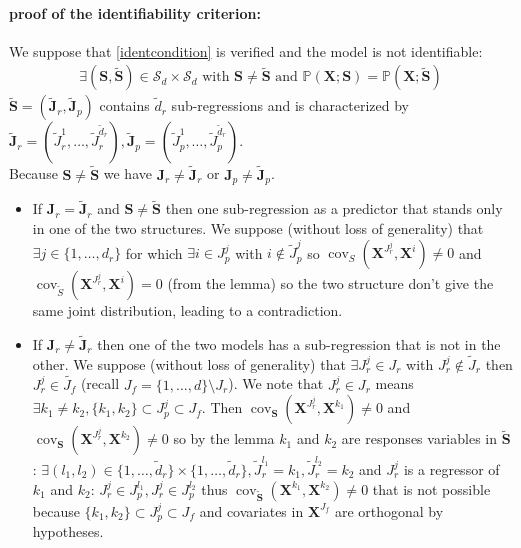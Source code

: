 \documentclass[11pt,a4paper]{article}
\begin{document}
\paragraph{proof of the identifiability criterion:} We suppose that \ref{identcondition} is verified and the model is not identifiable:
\begin{eqnarray}
	\exists (\boldsymbol{S},\tilde{\boldsymbol{S}}) \in \mathcal{S}_d\times \mathcal{S}_d \textrm{ with } \boldsymbol{S} \neq \tilde{\boldsymbol{S}} \textrm{ and }
	\mathbb{P}(\boldsymbol{X};\boldsymbol{S})=\mathbb{P}(\boldsymbol{X};\tilde{\boldsymbol{S}})
 \end{eqnarray}
 $\tilde{\boldsymbol{S}}=(\tilde{\boldsymbol{J}}_r,\tilde{\boldsymbol{J}}_p)$ contains $\tilde{d}_r$ sub-regressions and is characterized by $\tilde{\boldsymbol{J}}_r=(\tilde{J}_r^1,\dots,\tilde{J}_r^{\tilde{d}_r}),\tilde{\boldsymbol{J}}_p=(\tilde{J}_p^1,\dots,\tilde{J}_p^{\tilde{d}_r})$.\\
Because $\boldsymbol{S}\neq \tilde{\boldsymbol{S}} $ we have $\boldsymbol{J}_r\neq \tilde{\boldsymbol{J}}_r$ or $\boldsymbol{J}_p\neq \tilde{\boldsymbol{J}}_p$.
\begin{itemize}
\item If $\boldsymbol{J}_r = \tilde{\boldsymbol{J}}_r$ and $\boldsymbol{S}\neq \tilde{\boldsymbol{S}}$ then one sub-regression as a predictor that stands only in one of the two structures. We suppose (without loss of generality) that $\exists j \in \{1,\dots,d_r\}$ for which
$\exists i \in J_p^j$ with $i \notin \tilde{J}_p^j$ so $\operatorname{cov}_{S}(\boldsymbol{X}^{J_r^j},\boldsymbol{X}^{i})\neq 0$ and $\operatorname{cov}_{\tilde{S}}(\boldsymbol{X}^{J_r^j},\boldsymbol{X}^{i})= 0$ (from the lemma) so the two structure don't give the same joint distribution, leading to a contradiction.
\item If $\boldsymbol{J}_r\neq \tilde{\boldsymbol{J}}_r$ then one of the two models has a sub-regression that is not in the other. We suppose (without loss of generality) that
 $\exists J_r^j \in J_r$ with $J_r^j \notin \tilde{J}_r$ then $J_r^j\in \tilde{J_f}$ (recall $J_f=\{1,\dots,d \}\setminus J_r$). We note that $J_r^j \in J_r$ means $\exists k_1\neq k_2, \{k_1,k_2 \}\subset J_p^j \subset J_f$. Then $\operatorname{cov}_{\boldsymbol{S}}(\boldsymbol{X}^{J_r^j},\boldsymbol{X}^{k_1})\neq 0$ and $\operatorname{cov}_{\boldsymbol{S}}(\boldsymbol{X}^{J_r^j},\boldsymbol{X}^{k_2})\neq 0 $ so by the lemma $k_1$ and $k_2$ are responses variables in $\tilde{\boldsymbol{S}}$: $\exists (l_1,l_2) \in \{1,\dots,\tilde{d}_r \}\times \{1,\dots,\tilde{d}_r \}, \tilde{J}_r^{l_1}=k_1,\tilde{J}_r^{l_2}=k_2$ and $J_r^j$ is a regressor of $k_1$ and $k_2$: $J_r^j \in J_p^{l_1}, J_r^j \in J_p^{l_2}$ thus $\operatorname{cov}_{\tilde{\boldsymbol{S}}}(\boldsymbol{X}^{k_1},\boldsymbol{X}^{k_2})\neq 0$ that is not possible because $ \{k_1,k_2 \}\subset J_p^j \subset J_f$ and covariates in $\boldsymbol{X}^{J_f}$ are orthogonal by hypotheses.
\end{itemize}
\end{document}
